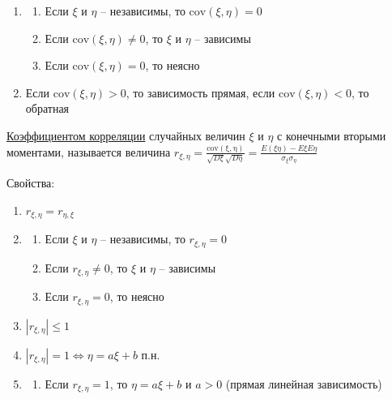 \begin{enumerate}
\begin{enumerate}
        \item \begin{enumerate}
            \item Если $\xi$ и $\eta$ -- независимы, то $\mathrm{cov}(\xi, \eta) = 0$

            \item Если $\mathrm{cov}(\xi, \eta) \neq 0$, то $\xi$ и $\eta$ -- зависимы

            \item Если $\mathrm{cov}(\xi, \eta) = 0$, то неясно
        \end{enumerate}

        \item Если $\mathrm{cov}(\xi, \eta) > 0$, то зависимость прямая, если $\mathrm{cov}(\xi, \eta) < 0$, то обратная
    \end{enumerate}

    \hyperlink{correlation}{Коэффициентом корреляции} случайных величин $\xi$ и $\eta$ с конечными вторыми моментами,
    называется величина $r_{\xi,\eta} = \frac{\mathrm{cov(\xi, \eta)}}{\sqrt{D\xi} \sqrt{D\eta}} = \frac{E(\xi\eta) - E\xi E\eta}{\sigma_\xi \sigma_\eta}$
    
    Свойства:

    \begin{enumerate}
        \item $r_{\xi, \eta} = r_{\eta, \xi}$

        \item \begin{enumerate}
            \item Если $\xi$ и $\eta$ -- независимы, то $r_{\xi,\eta} = 0$

            \item Если $r_{\xi,\eta} \neq 0$, то $\xi$ и $\eta$ -- зависимы

            \item Если $r_{\xi,\eta} = 0$, то неясно
        \end{enumerate}

        \item $|r_{\xi,\eta}| \leq 1$

        \item $|r_{\xi,\eta}| = 1 \Longleftrightarrow \eta = a \xi + b$ п.н.

        \item \begin{enumerate} 
            \item Если $r_{\xi,\eta} = 1$, то $\eta = a\xi + b$ и $a > 0$ (прямая линейная зависимость)


\end{enumerate}
\end{enumerate}
\end{enumerate}
